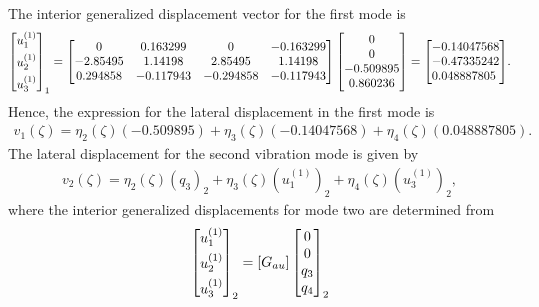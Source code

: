 \documentclass{AeroStructure-ERJohnson}
\begin{document}
\begin{example}
\begin{align}
\end{align}
The interior generalized displacement vector for the first mode is
\begin{align}\label{ex18.4k}
\left[\begin{array}{@{}l@{}}u_{1}^{(1)} \\[4pt] u_{2}^{(1)} \\[4pt] u_{3}^{(1)}\end{array}\right]_{1}=\left[\begin{array}{@{}cccc@{}}0 & 0.163299 & 0 & -0.163299 \\-2.85495 & 1.14198 & 2.85495 & 1.14198 \\0.294858 & -0.117943 & -0.294858 & -0.117943\end{array}\right]\left[\begin{array}{@{}c@{}}0 \\0 \\-0.509895 \\0.860236\end{array}\right]=\left[\begin{array}{@{}l@{}}-0.14047568 \\-0.47335242 \\0.048887805\end{array}\right]\!.
\end{align}
Hence, the expression for the lateral displacement in the first mode is
\begin{align}\label{ex18.4l}
v_{1}(\zeta)=\eta_{2}(\zeta)(-0.509895)+\eta_{3}(\zeta)(-0.14047568)+\eta_{4}(\zeta)(0.048887805).
\end{align}
The lateral displacement for the second vibration mode is given by
\begin{align}\label{ex18.4m}
v_{2}(\zeta)=\eta_{2}(\zeta)\left(q_{3}\right)_{2}+\eta_{3}(\zeta)\left(u_{1}^{(1)}\right)_{2}+\eta_{4}(\zeta)\left(u_{3}^{(1)}\right)_{2}, \end{align}
where the interior generalized displacements for mode two are determined from
\begin{align}\label{ex18.4n}
\left[\begin{array}{@{}c@{}}u_{1}^{(1)} \\[4pt] u_{2}^{(1)} \\[4pt] u_{3}^{(1)}\end{array}\right]_{2}=\left[G_{a u}\right]\left[\begin{array}{@{}c@{}}0 \\0 \\q_{3} \\q_{4}\end{array}\right]_{2}

\end{align}
\end{example}
\end{document}
